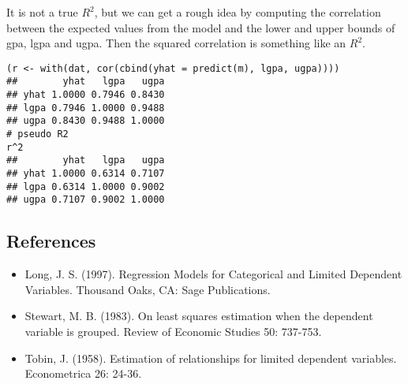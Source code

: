 \documentclass[a4paper,12pt]{article}
\begin{document}
It is not a true $R^2$, but we can get a rough idea by computing the correlation between the expected values from the model and the lower and upper bounds of gpa, lgpa and ugpa. Then the squared correlation is something like an $R^2$.
\begin{framed}
\begin{verbatim}
(r <- with(dat, cor(cbind(yhat = predict(m), lgpa, ugpa))))
##        yhat   lgpa   ugpa
## yhat 1.0000 0.7946 0.8430
## lgpa 0.7946 1.0000 0.9488
## ugpa 0.8430 0.9488 1.0000
# pseudo R2
r^2
##        yhat   lgpa   ugpa
## yhat 1.0000 0.6314 0.7107
## lgpa 0.6314 1.0000 0.9002
## ugpa 0.7107 0.9002 1.0000

\end{verbatim}
\end{framed}
\subsection{References}
\begin{itemize}
	\item Long, J. S. (1997). Regression Models for Categorical and Limited Dependent Variables. Thousand Oaks, CA: Sage Publications.
\item	Stewart, M. B. (1983). On least squares estimation when the dependent variable is grouped. Review of Economic Studies 50: 737-753.
\item	Tobin, J. (1958). Estimation of relationships for limited dependent variables. Econometrica 26: 24-36.
\end{itemize}
\end{document}
